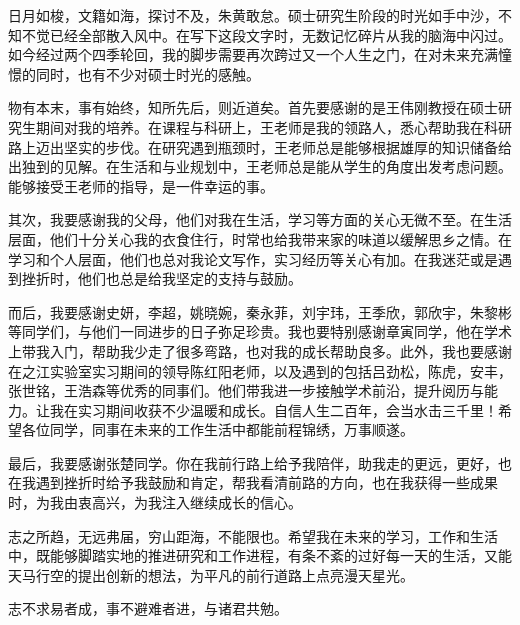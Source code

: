 \cleardoublepage
{}

日月如梭，文籍如海，探讨不及，朱黄敢怠。硕士研究生阶段的时光如手中沙，不知不觉已经全部散入风中。在写下这段文字时，无数记忆碎片从我的脑海中闪过。如今经过两个四季轮回，我的脚步需要再次跨过又一个人生之门，在对未来充满憧憬的同时，也有不少对硕士时光的感触。

物有本末，事有始终，知所先后，则近道矣。首先要感谢的是王伟刚教授在硕士研究生期间对我的培养。在课程与科研上，王老师是我的领路人，悉心帮助我在科研路上迈出坚实的步伐。在研究遇到瓶颈时，王老师总是能够根据雄厚的知识储备给出独到的见解。在生活和与业规划中，王老师总是能从学生的角度出发考虑问题。能够接受王老师的指导，是一件幸运的事。

其次，我要感谢我的父母，他们对我在生活，学习等方面的关心无微不至。在生活层面，他们十分关心我的衣食住行，时常也给我带来家的味道以缓解思乡之情。在学习和个人层面，他们也总对我论文写作，实习经历等关心有加。在我迷茫或是遇到挫折时，他们也总是给我坚定的支持与鼓励。

而后，我要感谢史妍，李超，姚晓婉，秦永菲，刘宇玮，王季欣，郭欣宇，朱黎彬等同学们，与他们一同进步的日子弥足珍贵。我也要特别感谢章寅同学，他在学术上带我入门，帮助我少走了很多弯路，也对我的成长帮助良多。此外，我也要感谢在之江实验室实习期间的领导陈红阳老师，以及遇到的包括吕劲松，陈虎，安丰，张世铭，王浩森等优秀的同事们。他们带我进一步接触学术前沿，提升阅历与能力。让我在实习期间收获不少温暖和成长。自信人生二百年，会当水击三千里！希望各位同学，同事在未来的工作生活中都能前程锦绣，万事顺遂。

最后，我要感谢张楚同学。你在我前行路上给予我陪伴，助我走的更远，更好，也在我遇到挫折时给予我鼓励和肯定，帮我看清前路的方向，也在我获得一些成果时，为我由衷高兴，为我注入继续成长的信心。

志之所趋，无远弗届，穷山距海，不能限也。希望我在未来的学习，工作和生活中，既能够脚踏实地的推进研究和工作进程，有条不紊的过好每一天的生活，又能天马行空的提出创新的想法，为平凡的前行道路上点亮漫天星光。

志不求易者成，事不避难者进，与诸君共勉。

\newpage